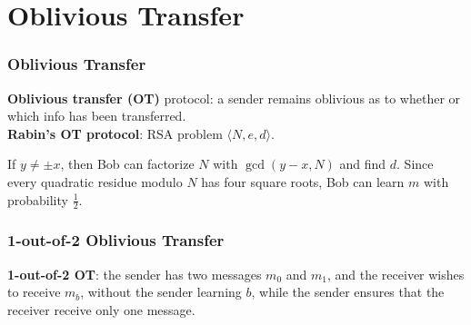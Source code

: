\section{Oblivious Transfer}
\begin{frame}\frametitle{Oblivious Transfer}
\textbf{Oblivious transfer (OT)} protocol: a sender remains oblivious as to whether or which info has been transferred.\\

\textbf{Rabin's OT protocol}: RSA problem $\langle N, e, d\rangle $.
\begin{figure}
\begin{center}

\end{center}
\end{figure}
If $y \neq \pm x$, then Bob can factorize $N$ with $\gcd(y-x,N)$ and find $d$. Since every quadratic residue modulo $N$ has four square roots, Bob can learn $m$ with probability $\frac{1}{2}$.
\end{frame}
\begin{frame}\frametitle{1-out-of-2 Oblivious Transfer}
\textbf{1-out-of-2 OT}: the sender has two messages $m_0$ and $m_1$, and the receiver  wishes to receive $m_b$, without the sender learning $b$, while the sender ensures that the receiver receive only one message.
\begin{figure}
\begin{center}

\end{center}
\end{figure}
\end{frame}
